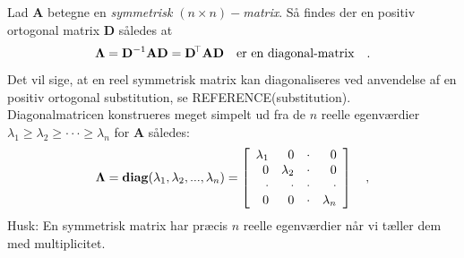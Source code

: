 \begin{theorem} \label{thmSpektral}
Lad $\mathbf{A}$ betegne en {\em{symmetrisk $(n \times n)-$matrix}}. Så findes der en
positiv ortogonal matrix $\mathbf{D}$ således at
\begin{equation}
\mathbf{\Lambda} = \mathbf{D}^{-1}\mathbf{A}\mathbf{D} = \mathbf{D}\hspace*{-.6mm}^{\top} \mathbf{A}\mathbf{D}\quad \textrm{er en diagonal-matrix} \quad .
\end{equation}
Det vil sige, at en reel symmetrisk matrix kan diagonaliseres ved anvendelse af en positiv ortogonal substitution, se REFERENCE(substitution).\\

Diagonalmatricen konstrueres meget simpelt ud fra de $n$ reelle egenværdier  $\lambda_{1} \geq \lambda_{2} \geq \cdot \cdot \cdot \geq \lambda_{n}$ for $\mathbf{A}$ således:
\begin{equation}
\mathbf{\Lambda} = \operatorname{\bf{diag}}(\lambda_{1}, \lambda_{2}, . . . , \lambda_{n}) = \left[
                                                                        \begin{array}{rrrr}
                                                                          \lambda_{1} & 0 & \cdot & 0 \\
                                                                          0 &  \lambda_{2} & \cdot & 0 \\
                                                                          \cdot & \cdot & \cdot & \cdot \\
                                                                          0 & 0 & \cdot &  \lambda_{n} \\
                                                                        \end{array}
                                                                      \right]
\quad,
\end{equation}
Husk: En symmetrisk matrix har præcis $n$ reelle egenværdier når vi tæller dem med multiplicitet. \bs


\end{theorem}
